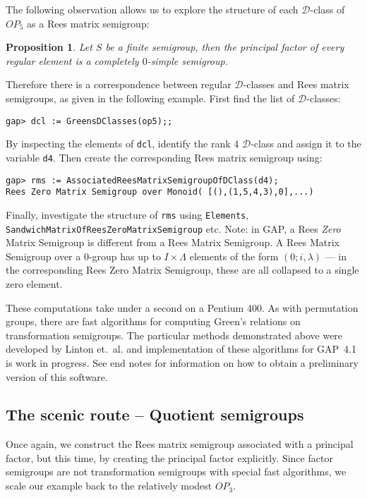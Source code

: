\documentclass{ws-p8-50x6-00}
\theoremstyle{plain} \newtheorem{Thm}{Theorem}
\theoremstyle{plain} \newtheorem{Cor}{Corollary}
\theoremstyle{plain} \newtheorem{Lemma}{Lemma}
\theoremstyle{plain} \newtheorem{Prop}{Proposition}
\theoremstyle{plain} \newtheorem{Ex}{Exercise}
\def\gap{\sf GAP}
\def\d{${\mathcal{D}}$}
\begin{document}
The following observation allows us to explore the structure of 
each \d-class of $OP_5$ as a Rees matrix semigroup:
\begin{Prop}\label{regfact}
Let $S$ be a finite semigroup, then the principal factor 
of every regular element is a completely $0$-simple semigroup.
\end{Prop}
Therefore there is a correspondence between regular 
\d-classes and Rees matrix semigroups, as given in the following
example. First find the list of \d-classes:
\begin{verbatim}
gap> dcl := GreensDClasses(op5);;
\end{verbatim}
By inspecting the elements of {\tt dcl}, identify the
rank 4 \d-class and assign it to the variable {\tt d4}. 
Then create the corresponding Rees matrix semigroup using:
\begin{verbatim}
gap> rms := AssociatedReesMatrixSemigroupOfDClass(d4);
Rees Zero Matrix Semigroup over Monoid( [(),(1,5,4,3),0],...)
\end{verbatim}
Finally, investigate the structure of {\tt rms} using 
{\tt Elements}, {\tt SandwichMatrixOfReesZeroMatrixSemigroup} etc.
Note: in {\gap}, a Rees {\it Zero} Matrix Semigroup  is different from 
a Rees Matrix Semigroup. A Rees Matrix Semigroup over a $0$-group 
has up to $I \times \Lambda$ elements of the form $(0; i, \lambda)$ --- in the 
corresponding Rees Zero Matrix Semigroup, these are all collapsed to a 
single zero element.


These computations take under a second on a Pentium 400. 
As with permutation groups, there are fast algorithms for
computing Green's relations on transformation semigroups.
The particular methods demonstrated above were developed  
by Linton et.~al.\cite{linton_tsemi} and implementation
of these algorithms for {\gap}~4.1 is work in progress.
See end notes for information on how to obtain a preliminary
version of this software.
 

\subsection{The scenic route -- Quotient semigroups}
Once again, we construct the 
Rees matrix semigroup associated with a principal factor, but
this time, by creating the principal factor explicitly. Since 
factor semigroups are not transformation semigroups with
special fast algorithms, we scale our example back to the 
relatively modest $OP_3$. 
\end{document}
